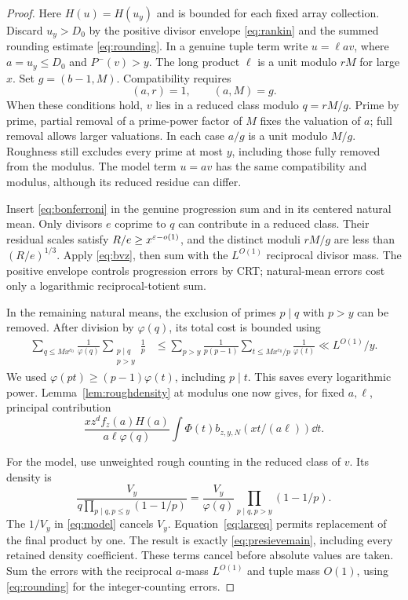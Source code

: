 \begin{proof}
Here $H(u)=H(u_y)$ and is bounded for each fixed array collection.
Discard $u_y>D_0$ by the positive divisor envelope
\eqref{eq:rankin} and the summed rounding estimate
\eqref{eq:rounding}. In a genuine tuple term write
$u=\ell av$, where $a=u_y\leq D_0$ and $P^-(v)>y$.
The long product $\ell$ is a unit modulo $rM$ for large $x$.
Set $g=(b-1,M)$. Compatibility requires
\begin{equation}\label{eq:compatibility}
 (a,r)=1,\qquad (a,M)=g.
\end{equation}
When these conditions hold, $v$ lies in a reduced class modulo
$q=rM/g$. Prime by prime, partial removal of a prime-power factor
of $M$ fixes the valuation of $a$; full removal allows larger
valuations. In each case $a/g$ is a unit modulo $M/g$.
Roughness still excludes every prime at most $y$, including those
fully removed from the modulus. The model term $u=av$ has the same
compatibility and modulus, although its reduced residue can differ.

Insert \eqref{eq:bonferroni} in the genuine progression sum and in
its centered natural mean. Only divisors $e$ coprime to $q$ can
contribute in a reduced class. Their residual scales satisfy
$R/e\geq x^{\varepsilon-o(1)}$, and the distinct moduli $rM/g$ are
less than $(R/e)^{1/3}$. Apply \eqref{eq:bvz}, then sum with the
$L^{O(1)}$ reciprocal divisor mass. The positive envelope controls
progression errors by CRT; natural-mean errors cost only a
logarithmic reciprocal-totient sum.

In the remaining natural means, the exclusion of primes $p\mid q$
with $p>y$ can be removed. After division by $\varphi(q)$, its
total cost is bounded using
\begin{align}\label{eq:largeq}
 \sum_{q\leq Mx^{c_0}}\frac1{\varphi(q)}
     \sum_{\substack{p\mid q\\p>y}}\frac1p
 &\leq\sum_{p>y}\frac1{p(p-1)}
           \sum_{t\leq Mx^{c_0}/p}\frac1{\varphi(t)}
 \ll L^{O(1)}/y.
\end{align}
We used $\varphi(pt)\geq(p-1)\varphi(t)$, including $p\mid t$.
This saves every logarithmic power. Lemma~\ref{lem:roughdensity}
at modulus one now gives, for fixed $a,\ell$, principal contribution
\begin{equation}\label{eq:presievemain}
 \frac{xz^df_z(a)H(a)}{a\ell\varphi(q)}
    \int\Phi(t)b_{z,y,N}(xt/(a\ell))\dd t.
\end{equation}

For the model, use unweighted rough counting in the reduced class
of $v$. Its density is
\begin{equation}\label{eq:roughq}
 \frac{V_y}{q\prod_{p\mid q, p\leq y}(1-1/p)}
 =\frac{V_y}{\varphi(q)}\prod_{p\mid q, p>y}(1-1/p).
\end{equation}
The $1/V_y$ in \eqref{eq:model} cancels $V_y$.
Equation~\eqref{eq:largeq} permits replacement of the final product
by one. The result is exactly \eqref{eq:presievemain}, including
every retained density coefficient. These terms cancel before
absolute values are taken. Sum the errors with the reciprocal
$a$-mass $L^{O(1)}$ and tuple mass $O(1)$, using
\eqref{eq:rounding} for the integer-counting errors.
\end{proof}

